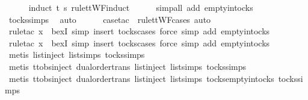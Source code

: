 \begin{isabellebody}
\ \ \ \ \isamarkupfalse%
\ {\isacharparenleft}induct\ t\ s\ rule{\isacharcolon}ttWF{}{\isachardot}induct{\isacharparenright}\isanewline
\ \ \ \ \isamarkupfalse%
\ {\isacharparenleft}simp{\isacharunderscore}all\ add{\isacharcolon}\ empty{\isacharunderscore}in{\isacharunderscore}tocks{\isacharparenright}\isanewline
\ \ \ \ \isamarkupfalse%
\ tocks{\isachardot}simps\ \isamarkupfalse%
\ auto{\isacharbrackleft}{}{\isacharbrackright}\isanewline
\ \ \ \ \isamarkupfalse%
\ {\isacharparenleft}case{\isacharunderscore}tac\ {\isasymsigma}\ rule{\isacharcolon}ttWF{\isachardot}cases{\isacharcomma}\ auto{\isacharparenright}\isanewline
\ \ \ \ \isamarkupfalse%
\ {\isacharparenleft}rule{\isacharunderscore}tac\ x{\isacharequal}{\isachardoublequoteopen}{\isacharbrackleft}{\isacharbrackright}{\isachardoublequoteclose}\ \ bexI{\isacharcomma}\ simp{\isacharcomma}\ insert\ tocks{\isachardot}cases{\isacharcomma}\ force{\isacharcomma}\ simp\ add{\isacharcolon}\ empty{\isacharunderscore}in{\isacharunderscore}tocks{\isacharparenright}\isanewline
\ \ \ \ \isamarkupfalse%
\ {\isacharparenleft}rule{\isacharunderscore}tac\ x{\isacharequal}{\isachardoublequoteopen}{\isacharbrackleft}{\isacharbrackright}{\isachardoublequoteclose}\ \ bexI{\isacharcomma}\ simp{\isacharcomma}\ insert\ tocks{\isachardot}cases{\isacharcomma}\ force{\isacharcomma}\ simp\ add{\isacharcolon}\ empty{\isacharunderscore}in{\isacharunderscore}tocks{\isacharparenright}\isanewline
\ \ \ \ \isamarkupfalse%
\ {\isacharparenleft}metis\ list{\isachardot}inject\ list{\isachardot}simps{\isacharparenleft}{}{\isacharparenright}\ tocks{\isachardot}simps{\isacharparenright}\isanewline
\ \ \ \ \isamarkupfalse%
\ {\isacharparenleft}metis\ ttobs{\isachardot}inject{\isacharparenleft}{}{\isacharparenright}\ dual{\isacharunderscore}order{\isachardot}trans\ list{\isachardot}inject\ list{\isachardot}simps{\isacharparenleft}{}{\isacharparenright}\ tocks{\isachardot}simps{\isacharparenright}\isanewline
\ \ \ \ \isamarkupfalse%
\ {\isacharparenleft}metis\ ttobs{\isachardot}inject{\isacharparenleft}{}{\isacharparenright}\ dual{\isacharunderscore}order{\isachardot}trans\ list{\isachardot}inject\ list{\isachardot}simps{\isacharparenleft}{}{\isacharparenright}\ tocks{\isachardot}empty{\isacharunderscore}in{\isacharunderscore}tocks\ tocks{\isachardot}simps{\isacharparenright}\isanewline

\end{isabellebody}
